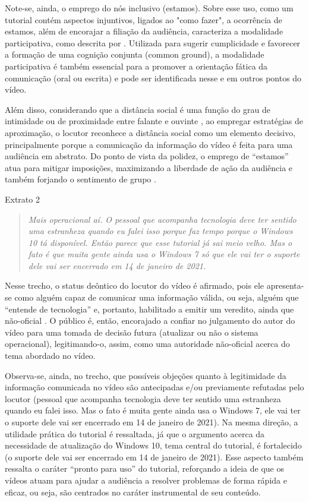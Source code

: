 \documentclass[portuguese]{textolivre}
\begin{document}
Note-se, ainda, o emprego do nós inclusivo (estamos). Sobre esse uso, como um tutorial contém aspectos injuntivos, ligados ao "como fazer", a ocorrência de estamos, além de encorajar a filiação da audiência, caracteriza a modalidade participativa, como descrita por \textcite{hazaparu2015}. Utilizada para sugerir cumplicidade e favorecer a formação de uma cognição conjunta (common ground), a modalidade participativa é também essencial para a promover a orientação fática da comunicação (oral ou escrita) e pode ser identificada nesse e em outros pontos do vídeo. 

Além disso, considerando que a distância social é uma função do grau de intimidade ou de proximidade entre falante e ouvinte \cite{brown1987}, ao empregar estratégias de aproximação, o locutor reconhece a distância social como um elemento decisivo, principalmente porque a comunicação da informação do vídeo é feita para uma audiência em abstrato. Do ponto de vista da polidez, o emprego de “estamos” atua para mitigar imposições, maximizando a liberdade de ação da audiência e também forjando o sentimento de grupo \cite{leech2014, miller2008}. 

\vspace{1ex}
Extrato 2
\begin{quote}
    \textit{Mais operacional aí. O pessoal que acompanha tecnologia deve ter sentido uma estranheza quando eu falei isso porque faz tempo porque o Windows 10 tá disponível. Então parece que esse tutorial já sai meio velho. Mas o fato é que muita gente ainda usa o Windows 7 só que ele vai ter o suporte dele vai ser encerrado em 14 de janeiro de 2021.}
\end{quote}

Nesse trecho, o status deôntico do locutor do vídeo é afirmado, pois ele apresenta-se como alguém capaz de comunicar uma informação válida, ou seja, alguém que “entende de tecnologia” e, portanto, habilitado a emitir um veredito, ainda que não-oficial \cite{austin1975, labinza2021}. O público é, então, encorajado a confiar no julgamento do autor do vídeo para uma tomada de decisão futura (atualizar ou não o sistema operacional), legitimando-o, assim, como uma autoridade não-oficial acerca do tema abordado no vídeo. 

Observa-se, ainda, no trecho, que possíveis objeções quanto à legitimidade da informação comunicada no vídeo são antecipadas e/ou previamente refutadas pelo locutor (pessoal que acompanha tecnologia deve ter sentido uma estranheza quando eu falei isso. Mas o fato é muita gente ainda usa o Windows 7, ele vai ter o suporte dele vai ser encerrado em 14 de janeiro de 2021). Na mesma direção, a utilidade prática do tutorial é ressaltada, já que o argumento acerca da necessidade de atualização do Windows 10, tema central do tutorial, é fortalecido (o suporte dele vai ser encerrado em 14 de janeiro de 2021). Esse aspecto também ressalta o caráter “pronto para uso” do tutorial, reforçando a ideia de que os vídeos atuam para ajudar a audiência a resolver problemas de forma rápida e eficaz, ou seja, são centrados no caráter instrumental de seu conteúdo.  
\end{document}
